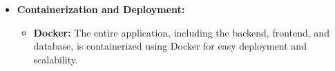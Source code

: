 \begin{itemize}
    \item \textbf{Containerization and Deployment:} 
    \begin{itemize}
        \item \textbf{Docker:} The entire application, including the backend, frontend, and database, is containerized using Docker for easy deployment and scalability.
    \end{itemize}
\end{itemize}



